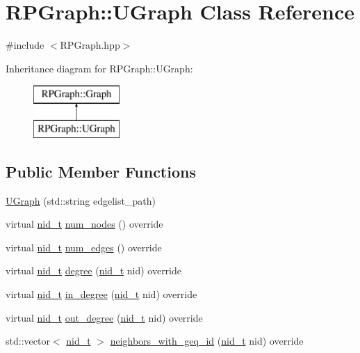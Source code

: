 \hypertarget{classRPGraph_1_1UGraph}{}\section{R\+P\+Graph\+:\+:U\+Graph Class Reference}
\label{classRPGraph_1_1UGraph}


{\ttfamily \#include $<$R\+P\+Graph.\+hpp$>$}

Inheritance diagram for R\+P\+Graph\+:\+:U\+Graph\+:\begin{figure}[H]
\begin{center}
\leavevmode
\includegraphics[height=2.000000cm]{classRPGraph_1_1UGraph}
\end{center}
\end{figure}
\subsection*{Public Member Functions}
\begin{DoxyCompactItemize}
\item 
\mbox{\hyperlink{classRPGraph_1_1UGraph_a2e52cd7b17ae1f839b45e26ec6ae1135}{U\+Graph}} (std\+::string edgelist\+\_\+path)
\item 
virtual \mbox{\hyperlink{namespaceRPGraph_ab3ae34f1ab88e48f43794c30c8697b74}{nid\+\_\+t}} \mbox{\hyperlink{classRPGraph_1_1UGraph_ad5eb18fffb7b9a64819b3f1f38305a0c}{num\+\_\+nodes}} () override
\item 
virtual \mbox{\hyperlink{namespaceRPGraph_ab3ae34f1ab88e48f43794c30c8697b74}{nid\+\_\+t}} \mbox{\hyperlink{classRPGraph_1_1UGraph_a55a5deea9a4d456e78e24a2002f31ef2}{num\+\_\+edges}} () override
\item 
virtual \mbox{\hyperlink{namespaceRPGraph_ab3ae34f1ab88e48f43794c30c8697b74}{nid\+\_\+t}} \mbox{\hyperlink{classRPGraph_1_1UGraph_a4d3c3af1ba4787ef5ced5f5efa9d05cf}{degree}} (\mbox{\hyperlink{namespaceRPGraph_ab3ae34f1ab88e48f43794c30c8697b74}{nid\+\_\+t}} nid) override
\item 
virtual \mbox{\hyperlink{namespaceRPGraph_ab3ae34f1ab88e48f43794c30c8697b74}{nid\+\_\+t}} \mbox{\hyperlink{classRPGraph_1_1UGraph_a5614092aab1bb8d92b625506f944d39c}{in\+\_\+degree}} (\mbox{\hyperlink{namespaceRPGraph_ab3ae34f1ab88e48f43794c30c8697b74}{nid\+\_\+t}} nid) override
\item 
virtual \mbox{\hyperlink{namespaceRPGraph_ab3ae34f1ab88e48f43794c30c8697b74}{nid\+\_\+t}} \mbox{\hyperlink{classRPGraph_1_1UGraph_a8416a5fa8b87b8569d0fa563288ac162}{out\+\_\+degree}} (\mbox{\hyperlink{namespaceRPGraph_ab3ae34f1ab88e48f43794c30c8697b74}{nid\+\_\+t}} nid) override
\item 
std\+::vector$<$ \mbox{\hyperlink{namespaceRPGraph_ab3ae34f1ab88e48f43794c30c8697b74}{nid\+\_\+t}} $>$ \mbox{\hyperlink{classRPGraph_1_1UGraph_a8cc5be5cfd41f351d4f98de816028f90}{neighbors\+\_\+with\+\_\+geq\+\_\+id}} (\mbox{\hyperlink{namespaceRPGraph_ab3ae34f1ab88e48f43794c30c8697b74}{nid\+\_\+t}} nid) override
\end{DoxyCompactItemize}
